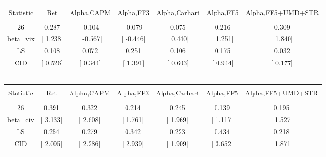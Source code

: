 \documentclass[16pt]{article}
\begin{document}
\begin{table}[!htbp] \centering 
  \caption{} 
  \label{} 
\begin{tabular}{@{\extracolsep{5pt}} ccccccc} 
\\[-1.8ex]\hline 
\hline \\[-1.8ex] 
Statistic & Ret & Alpha,CAPM & Alpha,FF3 & Alpha,Carhart & Alpha,FF5 & Alpha,FF5+UMD+STR \\ 
\hline \\[-1.8ex] 
26 & 0.287 & -0.104 & -0.079 & 0.075 & 0.216 & 0.309 \\ 
beta\_vix & [ 1.238] & [ -0.567] & [ -0.446] & [ 0.440] & [ 1.251] & [ 1.840] \\ 
LS & 0.108 & 0.072 & 0.251 & 0.106 & 0.175 & 0.032 \\ 
CID & [ 0.526] & [ 0.344] & [ 1.391] & [ 0.603] & [ 0.944] & [ 0.177] \\ 
\hline \\[-1.8ex] 
\end{tabular} 
\end{table}

\begin{table}[!htbp] \centering 
  \caption{} 
  \label{} 
\begin{tabular}{@{\extracolsep{5pt}} ccccccc} 
\\[-1.8ex]\hline 
\hline \\[-1.8ex] 
Statistic & Ret & Alpha,CAPM & Alpha,FF3 & Alpha,Carhart & Alpha,FF5 & Alpha,FF5+UMD+STR \\ 
\hline \\[-1.8ex] 
26 & 0.391 & 0.322 & 0.214 & 0.245 & 0.139 & 0.195 \\ 
beta\_civ & [ 3.133] & [ 2.608] & [ 1.761] & [ 1.969] & [ 1.117] & [ 1.527] \\ 
LS & 0.254 & 0.279 & 0.342 & 0.223 & 0.434 & 0.218 \\ 
CID & [ 2.095] & [ 2.286] & [ 2.939] & [ 1.909] & [ 3.652] & [ 1.871] \\ 
\hline \\[-1.8ex] 
\end{tabular} 
\end{table}
\end{document}
